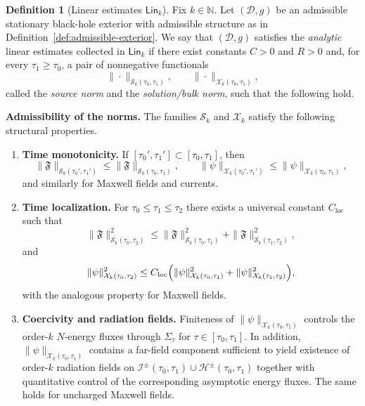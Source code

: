 \documentclass[11pt]{article}
\numberwithin{equation}{section}
\theoremstyle{plain}
\theoremstyle{definition}
\newtheorem{definition}{Definition}[section]
\theoremstyle{remark}
\newcommand{\Lin}{\mathsf{Lin}}
\begin{document}
\begin{definition}[Linear estimates $\Lin_{k}$]\label{def:lin-estimates}
Fix $k\in\mathbb N$.
Let $(\mathcal D,g)$ be an admissible stationary black-hole exterior with admissible structure as in Definition~\ref{def:admissible-exterior}.
We say that $(\mathcal D,g)$ satisfies the \emph{analytic} linear estimates collected in $\Lin_{k}$ if there exist constants $C>0$ and $R>0$ and, for every $\tau_{1}\ge\tau_{0}$, a pair of nonnegative functionals
\begin{equation}
\|\cdot\|_{\mathcal S_{k}(\tau_{0},\tau_{1})},\qquad
\|\cdot\|_{\mathcal X_{k}(\tau_{0},\tau_{1})},
\end{equation}
called the \emph{source norm} and the \emph{solution/bulk norm}, such that the following hold.

\smallskip
\noindent\textbf{Admissibility of the norms.}
The families $\mathcal S_{k}$ and $\mathcal X_{k}$ satisfy the following structural properties.
\begin{enumerate}
\item[(A1)] \textbf{Time monotonicity.}
If $[\tau_{0}',\tau_{1}']\subset[\tau_{0},\tau_{1}]$, then
\begin{equation}
\|\mathfrak{F}\|_{\mathcal S_{k}(\tau_{0}',\tau_{1}')} \le \|\mathfrak{F}\|_{\mathcal S_{k}(\tau_{0},\tau_{1})},
\qquad
\|\psi\|_{\mathcal X_{k}(\tau_{0}',\tau_{1}')} \le \|\psi\|_{\mathcal X_{k}(\tau_{0},\tau_{1})},
\end{equation}
and similarly for Maxwell fields and currents.
\item[(A2)] \textbf{Time localization.}
For $\tau_{0}\le\tau_{1}\le\tau_{2}$ there exists a universal constant $C_{\mathrm{loc}}$ such that
\begin{equation}
\|\mathfrak{F}\|_{\mathcal S_{k}(\tau_{0},\tau_{2})}^{2}
\le
\|\mathfrak{F}\|_{\mathcal S_{k}(\tau_{0},\tau_{1})}^{2}
+
\|\mathfrak{F}\|_{\mathcal S_{k}(\tau_{1},\tau_{2})}^{2},
\end{equation}
and
\begin{equation}
\|\psi\|_{\mathcal X_{k}(\tau_{0},\tau_{2})}^{2}
\le
C_{\mathrm{loc}}\Bigl(
\|\psi\|_{\mathcal X_{k}(\tau_{0},\tau_{1})}^{2}
+
\|\psi\|_{\mathcal X_{k}(\tau_{1},\tau_{2})}^{2}
\Bigr),
\end{equation}
with the analogous property for Maxwell fields.
\item[(A3)] \textbf{Coercivity and radiation fields.}
Finiteness of $\|\psi\|_{\mathcal X_{k}(\tau_{0},\tau_{1})}$ controls the order-$k$ $N$-energy fluxes through $\Sigma_{\tau}$ for $\tau\in[\tau_{0},\tau_{1}]$.
In addition, $\|\psi\|_{\mathcal X_{k}(\tau_{0},\tau_{1})}$ contains a far-field component sufficient to yield existence of order-$k$ radiation fields on $\mathcal I^{\pm}(\tau_{0},\tau_{1})\cup\mathcal H^{\pm}(\tau_{0},\tau_{1})$
together with quantitative control of the corresponding asymptotic energy fluxes.
The same holds for uncharged Maxwell fields.
\end{enumerate}


\end{definition}
\end{document}

